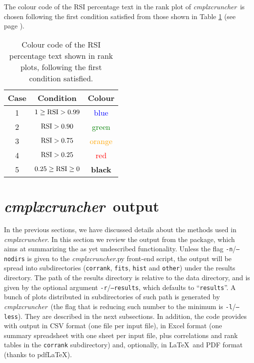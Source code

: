 \documentclass[12pt]{article}
\newcommand{\CC}[0]{\emph{cmplxcruncher}}
\begin{document}
The colour code of the RSI percentage text in the rank plot of \CC\ is chosen following the first condition satisfied from those shown in Table \ref{tab:RSI} (see page \pageref{tab:RSI}). 

\begin{table}
  \begin{center}
    \begin{tabular}{ccc}
    \hline
    Case  &  Condition  &  Colour  \\
    \hline
    1  &  $1\ge{\rm RSI}>0.99$  & \textcolor{blue}{blue}  \\ 
    2  & ${\rm RSI}>0.90$  &  \textcolor{green}{green}  \\
    3  &  ${\rm RSI}>0.75$  &  \textcolor{orange}{orange} \\
    4  &  ${\rm RSI}>0.25$  &  \textcolor{red}{red} \\
    5  &  $0.25\ge{\rm RSI}\ge0$  &  \bfseries{black}  \\
    \hline
    \end{tabular}
  \end{center}
  \caption{Colour code of the RSI percentage text shown in rank plots, following the first condition satisfied.}
  \label{tab:RSI}
\end{table}

\section{\CC\ output}
In the previous sections, we have discussed details about the methods used in \CC. In this section we review the output from the package, which aims at summarizing the as yet undescribed functionality. Unless the flag \texttt{-n}/\texttt{--nodirs} is given to the \CC.py front-end script, the output will be spread into subdirectories (\texttt{corrank}, \texttt{fits}, \texttt{hist} and \texttt{other}) under the results directory. The path of the results directory is relative to the data directory, and is given by the optional argument \texttt{-r}/\texttt{--results}, which defaults to ``\texttt{results}''. A bunch of plots distributed in subdirectories of such path is generated by \CC\ (the flag that is reducing such number to the minimum is \texttt{-l}/\texttt{--less}). They are described in the next subsections. In addition, the code provides with output in CSV format (one file per input file), in Excel format (one summary spreadsheet with one sheet per input file, plus correlations and rank tables in the \texttt{corrank} subdirectory) and, optionally, in \LaTeX\ and PDF format (thanks to pdf\LaTeX).
\end{document}

